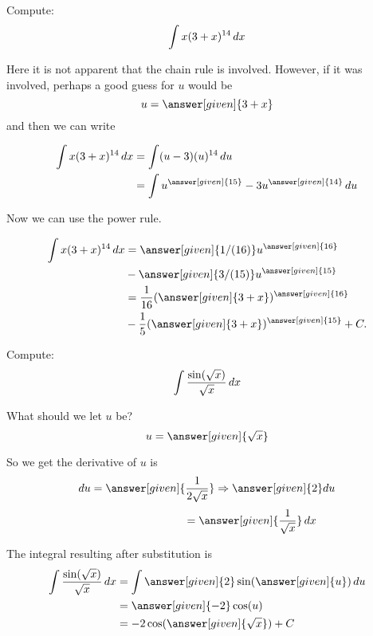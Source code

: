 \documentclass{ximera}
\begin{document}
\begin{example}
  Compute:
\[
\int x(3+x)^{14}\mathop{}\!d x
\]
\begin{explanation}
Here it is not apparent that the chain rule is involved. However, if
it was involved, perhaps a good guess for $u$ would be
\[
u = \answer[given]{3+x}
\]
and then we can write

\begin{align*}
    \int x(3+x)^{14}\d x &= \int(u-3)(u)^{14}\d u\\
    &= \int u^{\answer[given]{15}}-3u^{\answer[given]{14}}\d u
\end{align*}

Now we can use the power rule.

\begin{align*}
    \int x(3+x)^{14}\d x &= \answer[given]{1/(16)}u^{\answer[given]{16}}\\
    &-\answer[given]{3/(15)}u^{\answer[given]{15}}\\
    &= \frac{1}{16}(\answer[given]{3+x})^{\answer[given]{16}}\\
    &-\frac{1}{5}(\answer[given]{3+x})^{\answer[given]{15}}+C.
\end{align*}
\end{explanation}
\end{example}


\begin{example}
Compute:
\[
\int \frac{\sin(\sqrt{x})}{\sqrt{x}}\mathop{}\!d x
\]
\begin{explanation}
What should we let $u$ be?
\[
u = \answer[given]{\sqrt{x}}
\]

So we get the derivative of $u$ is 
\[
\d u = \answer[given]{\frac{1}{2\sqrt{x}}} \Rightarrow \answer[given]{2}du \\
\]
\[
\phantom{\d u = \frac{1}{2\sqrt{x}} \Rightarrow 2 du} =\answer[given]{\frac{1}{\sqrt{x}}} \d x
\]

The integral resulting after substitution is
\begin{align*}
\int \frac{\sin(\sqrt{x})}{\sqrt{x}}\d x &= \int\answer[given]{2}\sin(\answer[given]{u})\d u\\
&= \answer[given]{-2}\cos(u)\\
&=-2\cos(\answer[given]{\sqrt{x}})+C
\end{align*}


\end{explanation}
\end{example}
\end{document}
